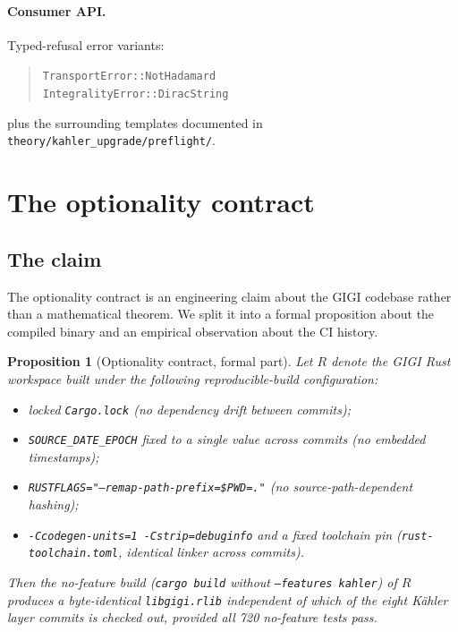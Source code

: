 \documentclass[11pt,letterpaper]{article}
\newtheorem{proposition}[theorem]{Proposition}
\begin{document}
\paragraph{Consumer API.}
Typed-refusal error variants:
\begin{quote}
\sloppy
\texttt{TransportError::NotHadamard} \\
\texttt{IntegralityError::DiracString}
\end{quote}
plus the surrounding templates documented in
\texttt{theory/kahler\_upgrade/preflight/}.


\section{The optionality contract}
\label{sec:optionality}

\subsection{The claim}

The optionality contract is an engineering claim about the GIGI
codebase rather than a mathematical theorem. We split it into a
formal proposition about the compiled binary and an empirical
observation about the CI history.

\begin{proposition}[Optionality contract, formal part]
\label{prop:optionality}
Let $R$ denote the GIGI Rust workspace built under the following
reproducible-build configuration:
\begin{itemize}[nosep]
\item locked \texttt{Cargo.lock} (no dependency drift between
  commits);
\item \texttt{SOURCE\_DATE\_EPOCH} fixed to a single value across
  commits (no embedded timestamps);
\item \texttt{RUSTFLAGS="--remap-path-prefix=\$PWD=."} (no
  source-path-dependent hashing);
\item \texttt{-Ccodegen-units=1 -Cstrip=debuginfo} and a fixed
  toolchain pin (\texttt{rust-toolchain.toml}, identical linker
  across commits).
\end{itemize}
Then the no-feature build (\texttt{cargo build} without
\texttt{--features kahler}) of $R$ produces a byte-identical
\texttt{libgigi.rlib} independent of which of the eight K\"ahler
layer commits is checked out, provided all 720 no-feature tests
pass.
\end{proposition}
\end{document}
